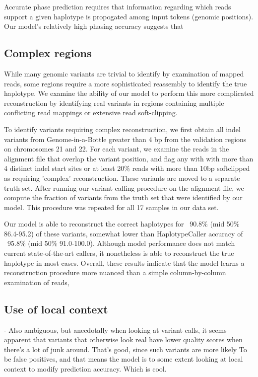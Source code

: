 \documentclass[]{article}
\begin{document}
Accurate phase prediction requires that information regarding which reads support a given haplotype is propogated among input tokens (genomic positions). Our model's relatively high phasing accuracy suggests that 


\subsection{Complex regions}
 While many genomic variants are trivial to identify by examination of mapped reads, some regions require a more sophisticated reassembly to identify the true haplotype. We examine the ability of our model to perform this more complicated reconstruction by identifying real variants in regions containing multiple conflicting read mappings or extensive read soft-clipping. 
 
 To identify variants requiring complex reconstruction, we first obtain all indel variants from Genome-in-a-Bottle greater than 4 bp from the validation regions on chromosomes 21 and 22. For each variant, we examine the reads in the alignment file that overlap the variant position, and flag any with with more than 4 distinct indel start sites or at least 20\% reads with more than 10bp softclipped as requiring 'complex' reconstruction. These variants are moved to a separate truth set. After running our variant calling procedure on the alignment file, we compute the fraction of variants from the truth set that were identified by our model. This procedure was repeated for all 17 samples in our data set. 

 Our model is able to reconstruct the correct haplotypes for ~90.8\% (mid 50\% 86.4-95.2) of these variants, somewhat lower than HaplotypeCaller accuracy of ~95.8\% (mid 50\% 91.0-100.0).  Although model performance does not match current state-of-the-art callers, it nonetheless is able to reconstruct the true haplotype in most cases. Overall, these results indicate that the model learns a reconstruction procedure more nuanced than a simple column-by-column examination of reads, 


\subsection{Use of local context}
 - Also ambiguous, but anecdotally when looking at variant calls, it seems apparent that variants that otherwise look real have lower quality scores when there's a lot of junk around. That's good, since such variants are more likely To
 be false positives, and that means the model is to some extent looking at local context to modify prediction accuracy. Which is cool. 
\end{document}
